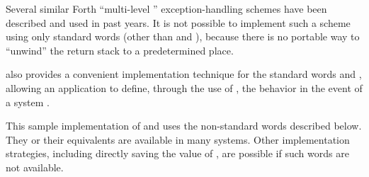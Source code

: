 Several similar Forth ``multi-level ''
exception-handling schemes have been described and used in past years.
It is not possible to implement such a scheme using only standard words
(other than  and ), because there is no portable
way to ``unwind'' the return stack to a predetermined place.

 also provides a convenient implementation technique for
the standard words  and , allowing an
application to define, through the use of , the behavior
in the event of a system .

This sample implementation of  and  uses the
non-standard words described below.  They or their equivalents are
available in many systems.  Other implementation strategies, including
directly saving the value of , are possible if such
words are not available.

